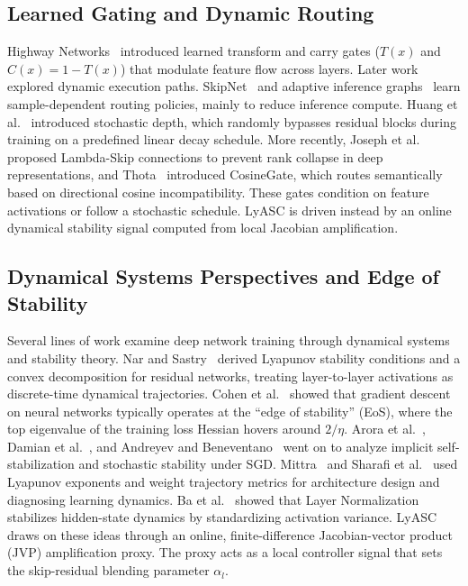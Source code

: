 \documentclass[conference,10pt]{IEEEtran}
\begin{document}
\subsection{Learned Gating and Dynamic Routing}

Highway Networks~\cite{srivastava2015highway} introduced learned
transform and carry gates ($T(x)$ and $C(x) = 1 - T(x)$) that modulate
feature flow across layers. Later work explored dynamic execution paths.
SkipNet~\cite{wang2018skipnet} and adaptive inference graphs~\cite{veit2020adaptive}
learn sample-dependent routing policies, mainly to reduce inference
compute. Huang et al.~\cite{huang2016deep} introduced stochastic depth,
which randomly bypasses residual blocks during training on a predefined
linear decay schedule. More recently, Joseph et al.~\cite{joseph2024lambda}
proposed Lambda-Skip connections to prevent rank collapse in deep
representations, and Thota~\cite{thota2025cosinegate} introduced
CosineGate, which routes semantically based on directional cosine
incompatibility. These gates condition on feature activations or follow a
stochastic schedule. LyASC is driven instead by an online dynamical
stability signal computed from local Jacobian amplification.

\subsection{Dynamical Systems Perspectives and Edge of Stability}

Several lines of work examine deep network training through dynamical
systems and stability theory. Nar and Sastry~\cite{nar2018residual}
derived Lyapunov stability conditions and a convex decomposition for
residual networks, treating layer-to-layer activations as discrete-time
dynamical trajectories. Cohen et al.~\cite{cohen2021gradient} showed that
gradient descent on neural networks typically operates at the ``edge of
stability'' (EoS), where the top eigenvalue of the training loss Hessian
hovers around $2/\eta$. Arora et al.~\cite{arora2022understanding},
Damian et al.~\cite{damian2022self}, and Andreyev and
Beneventano~\cite{andreyev2024edge} went on to analyze implicit
self-stabilization and stochastic stability under SGD. Mittra~\cite{mittra2024utilizing}
and Sharafi et al.~\cite{sharafi2024weight} used Lyapunov exponents and
weight trajectory metrics for architecture design and diagnosing
learning dynamics. Ba et al.~\cite{ba2016layer} showed that Layer
Normalization stabilizes hidden-state dynamics by standardizing
activation variance. LyASC draws on these ideas through an online,
finite-difference Jacobian-vector product (JVP) amplification proxy. The
proxy acts as a local controller signal that sets the skip-residual
blending parameter $\alpha_l$.
\end{document}
